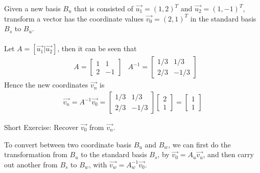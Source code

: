 \begin{exmp}
Given a new basis $B_u$ that is consisted of $\vec{u_1} = (1,2)^T$ and $\vec{u_2} = (1,-1)^T$, transform a vector has the coordinate values $\vec{v_0} = (2,1)^T$ in the standard basis $B_s$ to $B_u$.\\
\\
Let $A = [\vec{u_1}|\vec{u_2}]$, then it can be seen that
\begin{align*}
&A =
\begin{bmatrix}
1 & 1 \\
2 & -1
\end{bmatrix}
&A^{-1} =
\begin{bmatrix}
1/3 & 1/3 \\
2/3 & -1/3
\end{bmatrix}
\end{align*}
Hence the new coordinates $\vec{v_n}$ is
\begin{align*}
\vec{v_n} = A^{-1}\vec{v_0} = 
\begin{bmatrix}
1/3 & 1/3 \\
2/3 & -1/3
\end{bmatrix}
\begin{bmatrix}
2 \\
1
\end{bmatrix}
=
\begin{bmatrix}
1\\
1
\end{bmatrix}
\end{align*}
\begin{center}
\end{center}
Short Exercise: Recover $\vec{v_0}$ from $\vec{v_n}$.
\end{exmp}
To convert between two coordinate basis $B_u$ and $B_w$, we can first do the transformation from $B_u$ to the standard basis $B_s$, by $\vec{v_0} = A_u\vec{v_u}$, and then carry out another from $B_s$ to $B_w$, with $\vec{v_w} = A_w^{-1}\vec{v_0}$.

